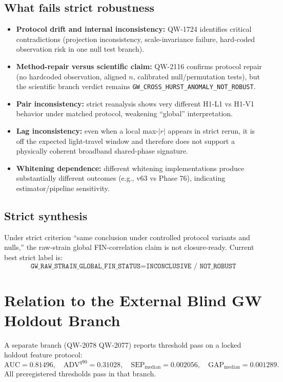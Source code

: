 \documentclass[11pt,a4paper]{article}
\begin{document}
\subsection{What fails strict robustness}
\begin{itemize}[leftmargin=1.5em]
    \item \textbf{Protocol drift and internal inconsistency:} QW-1724 identifies critical contradictions (projection inconsistency, scale-invariance failure, hard-coded observation risk in one null test branch).
    \item \textbf{Method-repair versus scientific claim:} QW-2116 confirms protocol repair (no hardcoded observation, aligned $n$, calibrated null/permutation tests), but the scientific branch verdict remains \texttt{GW\_CROSS\_HURST\_ANOMALY\_NOT\_ROBUST}.
    \item \textbf{Pair inconsistency:} strict reanalysis shows very different H1-L1 vs H1-V1 behavior under matched protocol, weakening ``global'' interpretation.
    \item \textbf{Lag inconsistency:} even when a local max-$|r|$ appears in strict rerun, it is off the expected light-travel window and therefore does not support a physically coherent broadband shared-phase signature.
    \item \textbf{Whitening dependence:} different whitening implementations produce substantially different outcomes (e.g., v63 vs Phase 76), indicating estimator/pipeline sensitivity.
\end{itemize}

\subsection{Strict synthesis}
Under strict criterion ``same conclusion under controlled protocol variants and nulls,'' the raw-strain global FIN-correlation claim is not closure-ready. Current best strict label is:
\begin{equation}
\texttt{GW\_RAW\_STRAIN\_GLOBAL\_FIN\_STATUS} = \texttt{INCONCLUSIVE / NOT\_ROBUST}
\end{equation}

\section{Relation to the External Blind GW Holdout Branch}
A separate branch (QW-2078 \textrightarrow{} QW-2077) reports threshold pass on a locked holdout feature protocol:
\[
\mathrm{AUC}=0.81496,\quad
\mathrm{ADV}^{q90}=0.31028,\quad
\mathrm{SEP}_{\mathrm{median}}=0.002056,\quad
\mathrm{GAP}_{\mathrm{median}}=0.001289.
\]
All preregistered thresholds pass in that branch.
\end{document}
